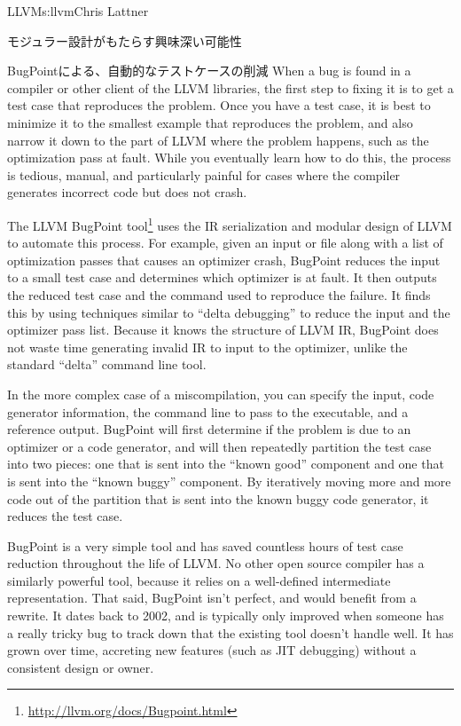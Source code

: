 \begin{aosachapter}{LLVM}{s:llvm}{Chris Lattner}
\begin{aosasect1}{モジュラー設計がもたらす興味深い可能性}
\begin{aosasect2}{BugPointによる、自動的なテストケースの削減}
When a bug is found in a compiler or other client of the LLVM
libraries, the first step to fixing it is to get a test case that
reproduces the problem.  Once you have a test case, it is best to
minimize it to the smallest example that reproduces the problem, and
also narrow it down to the part of LLVM where the problem happens,
such as the optimization pass at fault.  While you eventually learn
how to do this, the process is tedious, manual, and particularly
painful for cases where the compiler generates incorrect code but does
not crash.

The LLVM BugPoint
tool\footnote{\url{http://llvm.org/docs/Bugpoint.html}} uses the IR
serialization and modular design of LLVM to automate this process.
For example, given an input  or  file along with a
list of optimization passes that causes an optimizer crash, BugPoint
reduces the input to a small test case and determines which optimizer
is at fault.  It then outputs the reduced test case and the 
command used to reproduce the failure.  It finds this by using
techniques similar to ``delta debugging'' to reduce the input and the
optimizer pass list.  Because it knows the structure of LLVM IR,
BugPoint does not waste time generating invalid IR to input to the
optimizer, unlike the standard ``delta'' command line tool.

In the more complex case of a miscompilation, you can specify the
input, code generator information, the command line to pass to the
executable, and a reference output. BugPoint will first determine if
the problem is due to an optimizer or a code generator, and will then
repeatedly partition the test case into two pieces: one that is sent
into the ``known good'' component and one that is sent into the
``known buggy'' component.  By iteratively moving more and more code
out of the partition that is sent into the known buggy code generator,
it reduces the test case.

BugPoint is a very simple tool and has saved countless hours of test
case reduction throughout the life of LLVM\@.  No other open source
compiler has a similarly powerful tool, because it relies on a
well-defined intermediate representation.  That said, BugPoint isn't
perfect, and would benefit from a rewrite.  It dates back to 2002, and
is typically only improved when someone has a really tricky bug to
track down that the existing tool doesn't handle well. It has grown
over time, accreting new features (such as JIT debugging) without a
consistent design or owner.


\end{aosasect2}
\end{aosasect1}
\end{aosachapter}
